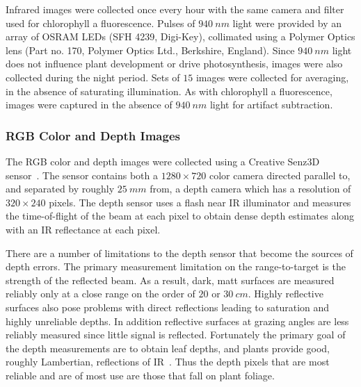 Infrared images were collected once every hour with the same camera and filter used for chlorophyll a fluorescence.
Pulses of $940~nm$ light were provided by an array of OSRAM LEDs (SFH 4239, Digi-Key), collimated using a Polymer Optics lens (Part no. 170, Polymer Optics Ltd., Berkshire, England).
Since $940~nm$ light does not influence plant development or drive photosynthesis, images were also collected during the night period.
Sets of $15$ images were collected for averaging, in the absence of saturating illumination.
As with chlorophyll a fluorescence, images were captured in the absence of $940~nm$ light for artifact subtraction.



\subsubsection{RGB Color and Depth Images} %

The RGB color and depth images were collected using a Creative Senz3D sensor~\cite{nguyen2015vietnamese}. The sensor contains both a $1280 \times 720$ color camera directed parallel to, and separated by roughly $25~mm$ from, a depth camera which has a resolution of $320\times240$ pixels.
The depth sensor uses a flash near IR illuminator and measures the time-of-flight of the beam at each pixel to obtain dense depth estimates along with an IR reflectance at each pixel.

There are a number of limitations to the depth sensor that become the sources of depth errors.
The primary measurement limitation on the range-to-target is the strength of the reflected beam.
As a result, dark, matt surfaces are measured reliably only at a close range on the order of $20$ or $30~cm$.
Highly reflective surfaces also pose problems with direct reflections leading to saturation and highly unreliable depths.
In addition reflective surfaces at grazing angles are less reliably measured since little signal is reflected.
Fortunately the primary goal of the depth measurements are to obtain leaf depths, and plants provide good, roughly Lambertian, reflections of IR~\cite{Chelle2006219}.  Thus the depth pixels that are most reliable and are of most use are those that fall on plant foliage.

